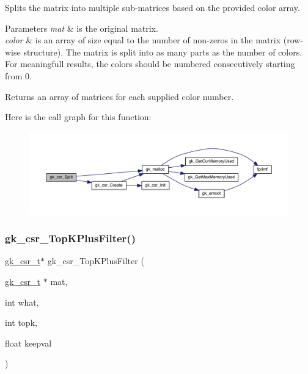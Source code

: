 Splits the matrix into multiple sub-\/matrices based on the provided color array. 
\begin{DoxyParams}{Parameters}
{\em mat} & is the original matrix. \\
\hline
{\em color} & is an array of size equal to the number of non-\/zeros in the matrix (row-\/wise structure). The matrix is split into as many parts as the number of colors. For meaningfull results, the colors should be numbered consecutively starting from 0. \\
\hline
\end{DoxyParams}
\begin{DoxyReturn}{Returns}
an array of matrices for each supplied color number. 
\end{DoxyReturn}
Here is the call graph for this function\+:\nopagebreak
\begin{figure}[H]
\begin{center}
\leavevmode
\includegraphics[width=350pt]{a00023_ac438fca404c3f1ff6989aa68f83ed241_cgraph}
\end{center}
\end{figure}
\mbox{\label{a00023_ad6f2c5699b47e1bc2285a1b391d7c7da}} 
\subsubsection{\texorpdfstring{gk\+\_\+csr\+\_\+\+Top\+K\+Plus\+Filter()}{gk\_csr\_TopKPlusFilter()}}
{\footnotesize\ttfamily \hyperlink{a00634}{gk\+\_\+csr\+\_\+t}$\ast$ gk\+\_\+csr\+\_\+\+Top\+K\+Plus\+Filter (\begin{DoxyParamCaption}\item[{\hyperlink{a00634}{gk\+\_\+csr\+\_\+t} $\ast$}]{mat,  }\item[{int}]{what,  }\item[{int}]{topk,  }\item[{float}]{keepval }\end{DoxyParamCaption})}

